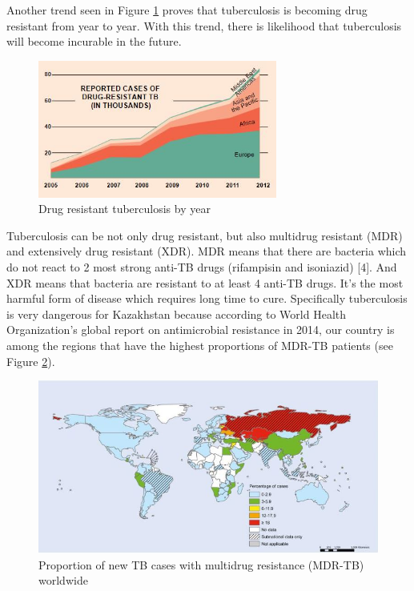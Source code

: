 Another trend seen in Figure \ref{fig7} proves that tuberculosis is becoming drug resistant from year to year. With this trend, there is likelihood that tuberculosis will become incurable in the future.

\begin{figure}[H]
  \centering
  \includegraphics[width=0.7\textwidth]{img/Fig7}
  \caption{Drug resistant tuberculosis by year}
  \label{fig7}
\end{figure}

Tuberculosis can be not only drug resistant, but also multidrug resistant (MDR) and extensively drug resistant (XDR). MDR means that there are bacteria which do not react to 2 most strong anti-TB drugs (rifampisin and isoniazid) [4]. And XDR means that bacteria are resistant to at least 4 anti-TB drugs. It’s the most harmful form of disease which requires long time to cure. Specifically tuberculosis is very dangerous for Kazakhstan because according to World Health Organization’s global report on antimicrobial resistance in 2014, our country is among the regions that have the highest proportions of MDR-TB patients (see Figure \ref{fig8}).

\begin{figure}[H]
  \centering
  \includegraphics[width=\textwidth]{img/Fig8}
  \caption{Proportion of new TB cases with multidrug resistance (MDR-TB) worldwide}
  \label{fig8}
\end{figure}

